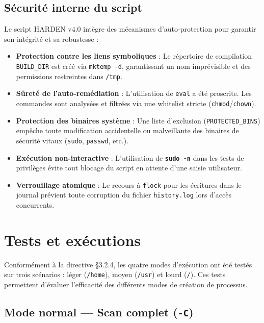 \documentclass[12pt,a4paper]{article}
\newcommand{\opt}[1]{\texttt{\textcolor{bleuMed}{\textbf{#1}}}}
\newcommand{\cmd}[1]{\texttt{\textcolor{codeText}{#1}}}
\newcommand{\fichier}[1]{\texttt{\textcolor{bleuENSET}{#1}}}
\begin{document}
\subsection{Sécurité interne du script}

Le script HARDEN v4.0 intègre des mécanismes d'auto-protection pour garantir son intégrité et sa robustesse :

\begin{itemize}
  \item \textbf{Protection contre les liens symboliques} : Le répertoire de compilation \cmd{BUILD\_DIR} est créé via \cmd{mktemp -d}, garantissant un nom imprévisible et des permissions restreintes dans \fichier{/tmp}.
  \item \textbf{Sûreté de l'auto-remédiation} : L'utilisation de \cmd{eval} a été proscrite. Les commandes sont analysées et filtrées via une whitelist stricte (\cmd{chmod}/\cmd{chown}).
  \item \textbf{Protection des binaires système} : Une liste d'exclusion (\cmd{PROTECTED\_BINS}) empêche toute modification accidentelle ou malveillante des binaires de sécurité vitaux (\cmd{sudo}, \cmd{passwd}, etc.).
  \item \textbf{Exécution non-interactive} : L'utilisation de \opt{sudo -n} dans les tests de privilèges évite tout blocage du script en attente d'une saisie utilisateur.
  \item \textbf{Verrouillage atomique} : Le recours à \cmd{flock} pour les écritures dans le journal prévient toute corruption du fichier \fichier{history.log} lors d'accès concurrents.
\end{itemize}

\newpage

\section{Tests et exécutions}

\begin{infobox}
Conformément à la directive §3.2.4, les quatre modes d'exécution ont été testés sur trois scénarios : léger (\fichier{/home}), moyen (\fichier{/usr}) et lourd (\fichier{/}). Ces tests permettent d'évaluer l'efficacité des différents modes de création de processus.
\end{infobox}

\subsection{Mode normal --- Scan complet (\opt{-C})}
\end{document}

